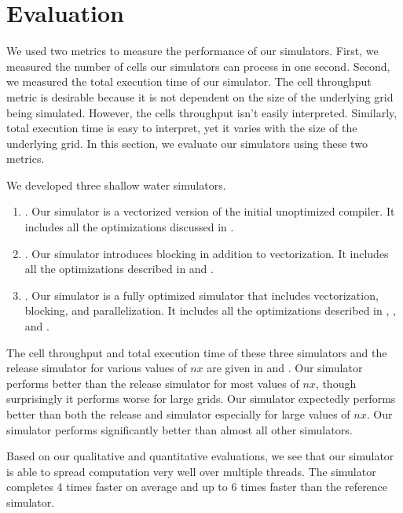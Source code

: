 \newcommand{\cps}{\frac{\text{cells}}{s}}

\section{Evaluation}\label{sec:evaluation}
We used two metrics to measure the performance of our simulators. First, we
measured the number of cells our simulators can process in one second. Second,
we measured the total execution time of our simulator. The cell throughput
metric is desirable because it is not dependent on the size of the underlying
grid being simulated. However, the cells throughput isn't easily interpreted.
Similarly, total execution time is easy to interpret, yet it varies with the
size of the underlying grid. In this section, we evaluate our simulators using
these two metrics.

We developed three shallow water simulators.
\begin{enumerate}
  \item {}.
    Our  simulator is a vectorized version of the initial unoptimized
    compiler. It includes all the optimizations discussed in
    .

  \item {}.
    Our  simulator introduces blocking in addition to vectorization.
    It includes all the optimizations described in  and
    .

  \item {}.
    Our  simulator is a fully optimized simulator that includes
    vectorization, blocking, and parallelization. It includes all the
    optimizations described in , ,
    and .
\end{enumerate}

The cell throughput and total execution time of these three simulators and the
release simulator for various values of $nx$ are given in
 and . Our 
simulator performs better than the release simulator for most values of $nx$,
though surprisingly it performs worse for large grids. Our 
simulator expectedly performs better than both the release and 
simulator especially for large values of $nx$. Our  simulator performs
significantly better than almost all other simulators.

Based on our qualitative and quantitative evaluations, we see that our
 simulator is able to spread computation very well over multiple
threads. The  simulator completes 4 times faster on average and
up to 6 times faster than the reference simulator.

